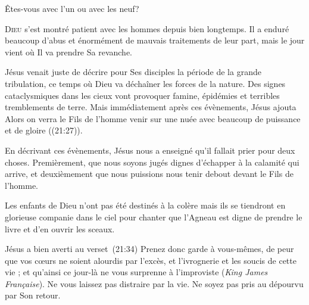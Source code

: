 Êtes-vous avec l'un ou avec les neuf?

\dvrule







\lettrine{D}{ieu} s'est montré patient avec les hommes
 depuis bien longtemps.
 Il a enduré beaucoup d'abus et énormément
 de mauvais traitements de leur part,
 mais le jour vient où Il va prendre Sa revanche.

Jésus venait juste de décrire pour Ses disciples la période
 de la grande tribulation, ce temps où Dieu va déchaîner les forces
 de la nature. Des signes cataclysmiques dans les cieux vont provoquer famine,
 épidémies et terribles tremblements de terre.
 Mais immédiatement après ces évènements, Jésus ajouta\frcolon{} 
 \Og Alors on verra le Fils de l'homme venir sur une nuée avec beaucoup
 de puissance et de gloire \Fg{} ((21:27)).


En décrivant ces évènements, Jésus nous a enseigné qu'il fallait prier pour deux choses.
 Premièrement, que nous soyons jugés dignes d'échapper à la calamité
 qui arrive, et deuxièmement que nous puissions nous tenir debout
 devant le Fils de l'homme.

Les enfants de Dieu n'ont pas été destinés à la colère mais ils se tiendront
 en glorieuse companie dans le ciel pour chanter que l'Agneau
 est digne de prendre le livre et d'en ouvrir les sceaux.

Jésus a bien averti au verset~(21:34)\frcolon{} 
 \Og Prenez donc garde à vous-mêmes, de peur que vos c\oe{}urs ne soient
 alourdis par l’excès, et l’ivrognerie et les soucis de cette vie ;
 et qu'ainsi ce jour-là ne vous surprenne à l’improviste \Fg{}
 (\textit{King James Fran\c{c}aise}).
 Ne vous laissez pas distraire par la vie.
 Ne soyez pas pris au dépourvu par Son retour.

